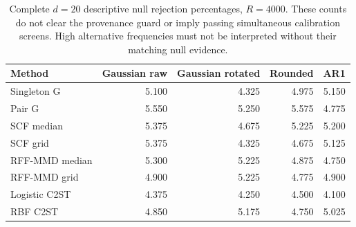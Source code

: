 {\color{blue}
\begin{table}[t]
\color{blue}
\centering
\small
\caption{Complete $d=20$ descriptive null rejection percentages, $R=4000$. These counts do not clear the provenance guard or imply passing simultaneous calibration screens. High alternative frequencies must not be interpreted without their matching null evidence.}
\label{tab:comparator-d20-null-descriptive}
\setlength{\tabcolsep}{8pt}
\renewcommand{\arraystretch}{1.2}
\begin{tabular}{lrrrr}
\toprule
Method & Gaussian raw & Gaussian rotated & Rounded & AR1\\
\midrule
Singleton G & 5.100 & 4.325 & 4.975 & 5.150 \\
Pair G & 5.550 & 5.250 & 5.575 & 4.775 \\
SCF median & 5.375 & 4.675 & 5.225 & 5.200 \\
SCF grid & 5.375 & 4.325 & 4.675 & 5.125 \\
RFF-MMD median & 5.300 & 5.225 & 4.875 & 4.750 \\
RFF-MMD grid & 4.900 & 5.225 & 4.775 & 4.900 \\
Logistic C2ST & 4.375 & 4.250 & 4.500 & 4.100 \\
RBF C2ST & 4.850 & 5.175 & 4.750 & 5.025 \\
\bottomrule
\end{tabular}
\end{table}
}
